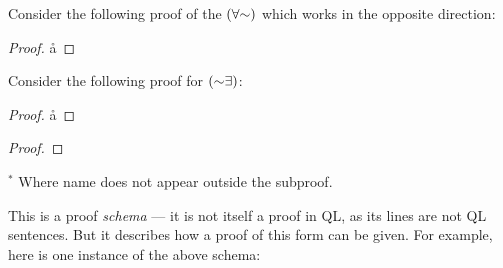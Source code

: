 Consider the following proof of the $(\forall\enot)$ which works in the opposite direction: 

\begin{proof}
	      \pr{}
    \open
              \as{}
            
        \r{a}
    \close
       
         
\end{proof}



Consider the following proof for $(\enot\exists)$:

\begin{proof}
	      \pr{}
    \open
            
             
        \r{a}
    \close
       
         
\end{proof}



\begin{proof}
	 
	\open
		\open
			\open
			\close
		\close
		\close
\end{proof}
$^\ast$ Where name  does not appear outside the subproof.

This is a proof \emph{schema} --- it is not itself a proof in QL, as its lines are not QL sentences. But it describes how a proof of this form can be given. For example, here is one instance of the above schema:


